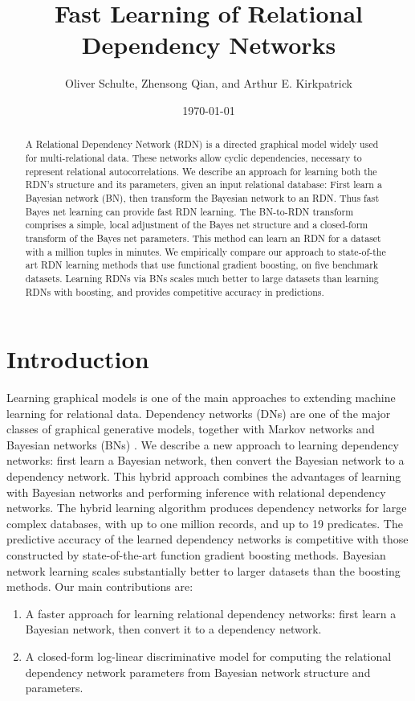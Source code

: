 \documentclass[runningheads,a4paper]{llncs}
\title{Fast Learning of Relational Dependency Networks}
\author{ Oliver Schulte, Zhensong Qian, and  Arthur E. Kirkpatrick
 }
\institute{ School of Computing Science\\ Simon Fraser University\\Burnaby and Surrey, BC, Canada\\
\{oschulte,zqian,ted\}@sfu.ca\\}
\date{\today}
\begin{document}
\maketitle



\begin{abstract} 
A Relational Dependency Network (RDN) is a directed graphical model widely used for multi-relational data. These networks allow cyclic dependencies, necessary to represent relational autocorrelations. We describe an approach for learning both the RDN's structure and its parameters, given an input relational database: First learn a Bayesian network (BN), then transform the Bayesian network to an RDN. Thus fast Bayes net learning can provide fast RDN learning. The BN-to-RDN transform comprises a simple, local adjustment of the Bayes net structure and a closed-form transform of the Bayes net parameters. This method can learn an RDN for a dataset with a million tuples in minutes. We empirically compare our approach to state-of-the art RDN learning methods that use functional gradient boosting, on five benchmark datasets. Learning RDNs via BNs scales much better to large datasets than learning RDNs with boosting, and provides competitive accuracy in predictions.\end{abstract}


 \section{Introduction} \label{sec:intro} Learning graphical models is one of the main approaches to extending machine learning for relational data. 
Dependency networks (DNs) \cite{Heckerman2000} are one of the major classes of graphical generative models, together with Markov networks and Bayesian networks (BNs) \cite{Pearl1988}. We describe a new approach to learning dependency networks: first learn a Bayesian network, then convert the Bayesian network to a dependency network. 
This hybrid approach combines the advantages of learning with Bayesian networks and performing inference with relational dependency networks. 
The hybrid learning algorithm produces dependency networks for large complex databases, with up to one million records, and up to 19 predicates. The predictive accuracy of the learned dependency networks is competitive with those constructed by state-of-the-art function gradient boosting methods.
Bayesian network learning scales substantially better   to larger datasets than the boosting methods.
%
Our main contributions are:
\begin{enumerate}
\item A faster approach for learning relational dependency networks: first learn a Bayesian network, then convert it to a dependency network.
\item A closed-form log-linear discriminative model for computing the relational dependency network parameters from Bayesian network structure and parameters.
\end{enumerate}
  
\end{document}
